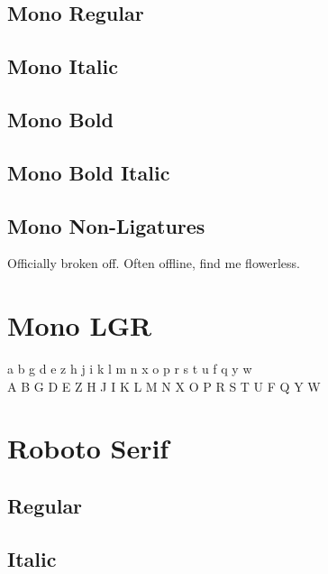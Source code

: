 \documentclass{article}
\begin{document}
\subsection*{Mono Regular}
\texttt{\lipsum[1]}

\subsection*{Mono Italic}
\texttt{\textit{\lipsum[2]}}

\subsection*{Mono Bold}

\texttt{\textbf{\lipsum[3]}}



\subsection*{Mono Bold Italic}

\texttt{\textbf{\textit{\lipsum[4]}}}

\subsection*{Mono Non-Ligatures}


{\robotomono Officially broken off. Often offline, find me flowerless.}


\section*{Mono LGR}


{\robotomonolgr\noindent
 a b g d e z h j i k l m n x o p r s t u f q y w\\
 A B G D E Z H J I K L M N X O P R S T U F Q Y W\\
}


\newpage 
\section*{Roboto Serif}

\rmfamily

\subsection*{Regular}
\lipsum[1]

\subsection*{Italic}
\textit{\lipsum[2]}
\end{document}
